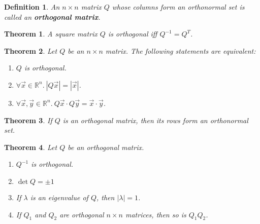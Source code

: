 \documentclass{article}
\theoremstyle{sltheorem}
\newtheorem{definition}{Definition}[section]
\newtheorem{theorem}{Theorem}[section]
\begin{document}
\begin{definition}
    An $n \times n$ matrix $Q$ whose columns form an orthonormal set is called an \linebreak \textbf{orthogonal matrix}.
\end{definition}
\begin{theorem}
    A square matrix $Q$ is orthogonal iff $Q^{-1}=Q^T$.
\end{theorem}
\begin{theorem}
    Let $Q$ be an $n\times n$ matrix. The following statements are equivalent:
    \begin{enumerate}
        \item $Q$ is orthogonal.
        \item $\forall \vec x \in \mathbb{R}^n.\:|Q\vec x| = |\vec x|$.
        \item $\forall \vec x, \vec y \in \mathbb{R}^n.\:Q\vec x\cdot Q\vec y = \vec x\cdot \vec y$.
    \end{enumerate}
\end{theorem}
\begin{theorem}
    If $Q$ is an orthogonal matrix, then its rows form an orthonormal set.
\end{theorem}
\begin{theorem}
    Let $Q$ be an orthogonal matrix.
    \begin{enumerate}
        \item $Q^{-1}$ is orthogonal.
        \item $\det Q = \pm 1$
        \item If $\lambda$ is an eigenvalue of $Q$, then $|\lambda|=1$.
        \item If $Q_1$ and $Q_2$ are orthogonal $n\times n$ matrices, then so is $Q_1Q_2$.
    \end{enumerate}
\end{theorem}
\end{document}
